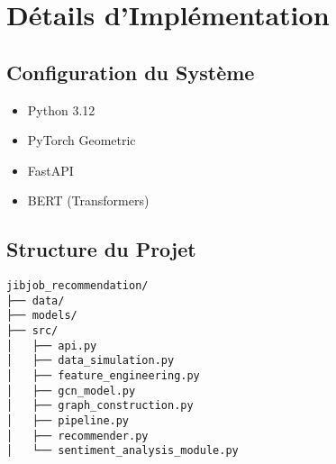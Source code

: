 \documentclass[12pt,a4paper]{article}
\begin{document}
\appendix
\section{Détails d'Implémentation}
\subsection{Configuration du Système}
\begin{itemize}
    \item Python 3.12
    \item PyTorch Geometric
    \item FastAPI
    \item BERT (Transformers)
\end{itemize}

\subsection{Structure du Projet}
\begin{verbatim}
jibjob_recommendation/
├── data/
├── models/
├── src/
│   ├── api.py
│   ├── data_simulation.py
│   ├── feature_engineering.py
│   ├── gcn_model.py
│   ├── graph_construction.py
│   ├── pipeline.py
│   ├── recommender.py
│   └── sentiment_analysis_module.py
\end{verbatim}
\end{document}
